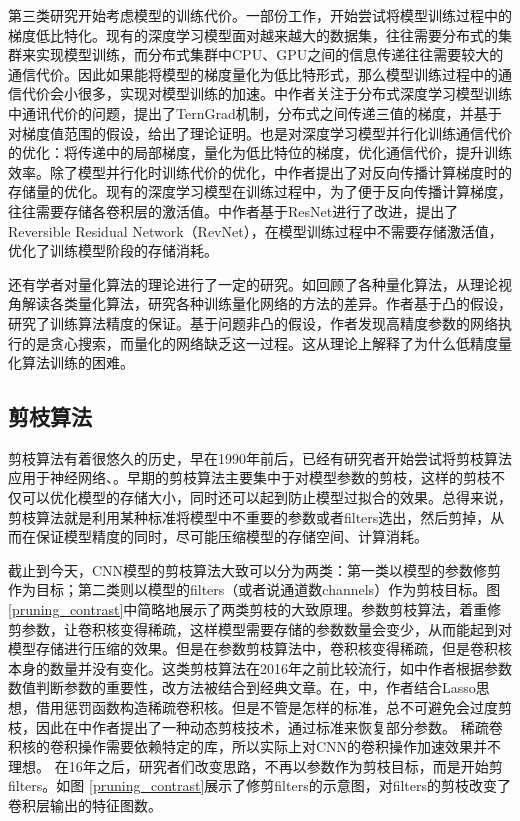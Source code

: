 \documentclass[ pdftex, oneside, master]{NJUthesis}
\begin{document}
第三类研究开始考虑模型的训练代价。一部份工作，开始尝试将模型训练过程中的梯度低比特化。现有的深度学习模型面对越来越大的数据集，往往需要分布式的集群来实现模型训练，而分布式集群中CPU、GPU之间的信息传递往往需要较大的通信代价。因此如果能将模型的梯度量化为低比特形式，那么模型训练过程中的通信代价会小很多，实现对模型训练的加速。\cite{nipsq72}中作者关注于分布式深度学习模型训练中通讯代价的问题，提出了TernGrad机制，分布式之间传递三值的梯度，并基于对梯度值范围的假设，给出了理论证明。\cite{icmlq83}也是对深度学习模型并行化训练通信代价的优化：将传递中的局部梯度，量化为低比特位的梯度，优化通信代价，提升训练效率。除了模型并行化时训练代价的优化，\cite{nipsq75}中作者提出了对反向传播计算梯度时的存储量的优化。现有的深度学习模型在训练过程中，为了便于反向传播计算梯度，往往需要存储各卷积层的激活值。\cite{nipsq75}中作者基于ResNet进行了改进，提出了Reversible Residual Network（RevNet），在模型训练过程中不需要存储激活值，优化了训练模型阶段的存储消耗。

还有学者对量化算法的理论进行了一定的研究。如\cite{nipsq74}回顾了各种量化算法，从理论视角解读各类量化算法，研究各种训练量化网络的方法的差异。作者基于凸的假设，研究了训练算法精度的保证。基于问题非凸的假设，作者发现高精度参数的网络执行的是贪心搜索，而量化的网络缺乏这一过程。这从理论上解释了为什么低精度量化算法训练的困难。

\subsection{剪枝算法}
剪枝算法有着很悠久的历史，早在1990年前后，已经有研究者开始尝试将剪枝算法应用于神经网络\cite{90prune}、\cite{92prune}。早期的剪枝算法主要集中于对模型参数的剪枝，这样的剪枝不仅可以优化模型的存储大小，同时还可以起到防止模型过拟合的效果。总得来说，剪枝算法就是利用某种标准将模型中不重要的参数或者filters选出，然后剪掉，从而在保证模型精度的同时，尽可能压缩模型的存储空间、计算消耗。

截止到今天，CNN模型的剪枝算法大致可以分为两类：第一类以模型的参数修剪作为目标；第二类则以模型的filters（或者说通道数channels）作为剪枝目标。图 \ref{pruning_contrast}中简略地展示了两类剪枝的大致原理。参数剪枝算法，着重修剪参数，让卷积核变得稀疏，这样模型需要存储的参数数量会变少，从而能起到对模型存储进行压缩的效果。但是在参数剪枝算法中，卷积核变得稀疏，但是卷积核本身的数量并没有变化。这类剪枝算法在2016年之前比较流行，如\cite{9}中作者根据参数数值判断参数的重要性，改方法被结合到经典文章\cite{10}。在\cite{12}，\cite{16}中，作者结合Lasso思想，借用惩罚函数构造稀疏卷积核。但是不管是怎样的标准，总不可避免会过度剪枝，因此在\cite{11}中作者提出了一种动态剪枝技术，通过标准来恢复部分参数。 稀疏卷积核的卷积操作需要依赖特定的库，所以实际上对CNN的卷积操作加速效果并不理想。
在16年之后，研究者们改变思路，不再以参数作为剪枝目标，而是开始剪filters。如图 \ref{pruning_contrast}展示了修剪filters的示意图，对filters的剪枝改变了卷积层输出的特征图数。
\end{document}
